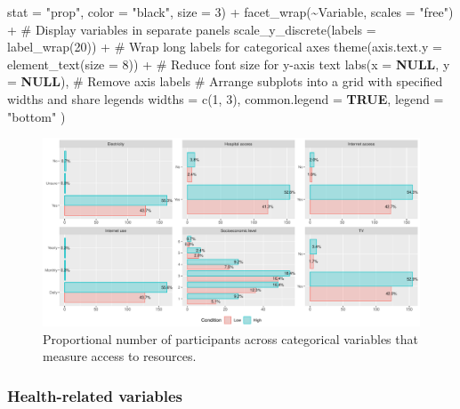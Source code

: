\documentclass[
  bookmarksnumbered]{article}
\newenvironment{Shaded}{\begin{snugshade}}{\end{snugshade}}
\newcommand{\AttributeTok}[1]{\textcolor[rgb]{0.80,0.80,0.80}{#1}}
\newcommand{\CommentTok}[1]{\textcolor[rgb]{0.50,0.62,0.50}{#1}}
\newcommand{\ConstantTok}[1]{\textcolor[rgb]{0.86,0.64,0.64}{\textbf{#1}}}
\newcommand{\DecValTok}[1]{\textcolor[rgb]{0.86,0.86,0.80}{#1}}
\newcommand{\FunctionTok}[1]{\textcolor[rgb]{0.94,0.94,0.56}{#1}}
\newcommand{\NormalTok}[1]{\textcolor[rgb]{0.80,0.80,0.80}{#1}}
\newcommand{\SpecialCharTok}[1]{\textcolor[rgb]{0.86,0.64,0.64}{#1}}
\newcommand{\StringTok}[1]{\textcolor[rgb]{0.80,0.58,0.58}{#1}}
\begin{document}
\begin{Shaded}
\begin{Highlighting}[]
               \AttributeTok{stat =} \StringTok{"prop"}\NormalTok{,}
               \AttributeTok{color =} \StringTok{"black"}\NormalTok{,}
               \AttributeTok{size =} \DecValTok{3}\NormalTok{) }\SpecialCharTok{+}
  \FunctionTok{facet\_wrap}\NormalTok{(}\SpecialCharTok{\textasciitilde{}}\NormalTok{Variable, }\AttributeTok{scales =} \StringTok{"free"}\NormalTok{) }\SpecialCharTok{+}  \CommentTok{\# Display variables in separate panels}
  \FunctionTok{scale\_y\_discrete}\NormalTok{(}\AttributeTok{labels =} \FunctionTok{label\_wrap}\NormalTok{(}\DecValTok{20}\NormalTok{)) }\SpecialCharTok{+}  \CommentTok{\# Wrap long labels for categorical axes}
  \FunctionTok{theme}\NormalTok{(}\AttributeTok{axis.text.y =} \FunctionTok{element\_text}\NormalTok{(}\AttributeTok{size =} \DecValTok{8}\NormalTok{)) }\SpecialCharTok{+}  \CommentTok{\# Reduce font size for y{-}axis text}
  \FunctionTok{labs}\NormalTok{(}\AttributeTok{x =} \ConstantTok{NULL}\NormalTok{, }\AttributeTok{y =} \ConstantTok{NULL}\NormalTok{),  }\CommentTok{\# Remove axis labels}
  \CommentTok{\# Arrange subplots into a grid with specified widths and share legends}
  \AttributeTok{widths =} \FunctionTok{c}\NormalTok{(}\DecValTok{1}\NormalTok{, }\DecValTok{3}\NormalTok{),}
  \AttributeTok{common.legend =} \ConstantTok{TRUE}\NormalTok{,}
  \AttributeTok{legend =} \StringTok{"bottom"}
\NormalTok{)}
\end{Highlighting}
\end{Shaded}

\begin{figure}
\centering
\includegraphics{Supplementary_material_files/figure-latex/resource-desc-plot-1.pdf}
\caption{\label{fig:resource-desc-plot}Proportional number of participants across categorical variables that measure access to resources.}
\end{figure}

\subsubsection{Health-related variables}\label{health-related-variables}
\end{document}
